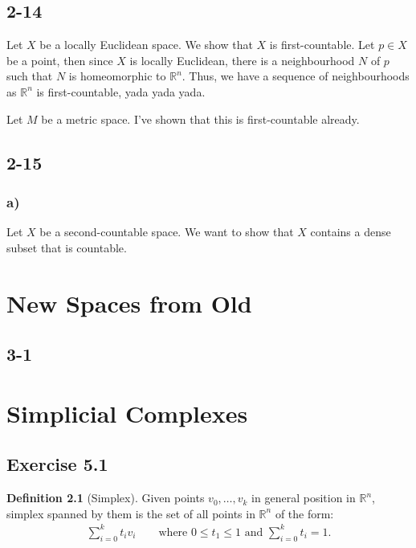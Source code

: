 \documentclass[a4paper]{book}
\theoremstyle{definition}
\newtheorem{definition}{Definition}[]
\begin{document}
\section*{2-14}
Let \(X\) be a locally Euclidean space. We show that \(X\) is first-countable. Let \(p \in X\) be a point, then since \(X\) is locally Euclidean, there is a neighbourhood \(N\) of \(p\) such that \(N\) is homeomorphic to \(\mathbb{R}^n\). Thus, we have a sequence of neighbourhoods as \(\mathbb{R}^n\) is first-countable, yada yada yada.

\noindent Let \(M\) be a metric space. I've shown that this is first-countable already.

\section*{2-15}
\subsection*{a)}
Let \(X\) be a second-countable space. We want to show that \(X\) contains a dense subset that is countable.

\chapter{New Spaces from Old}
\section*{3-1}

\chapter{Simplicial Complexes}

\section*{Exercise 5.1}

\begin{definition}[Simplex]
    Given points \(v_0, \ldots, v_k\) in general position in \(\mathbb{R}^n\), simplex spanned by them is the set of all points in \(\mathbb{R}^n\) of the form:
    \begin{align*}
        \sum_{i=0}^k t_i v_i \qquad \text{where } 0 \leq t_1 \leq 1 \text{ and } \sum_{i=0}^k t_i = 1 \text{.} 
    \end{align*}
\end{definition}
\end{document}
